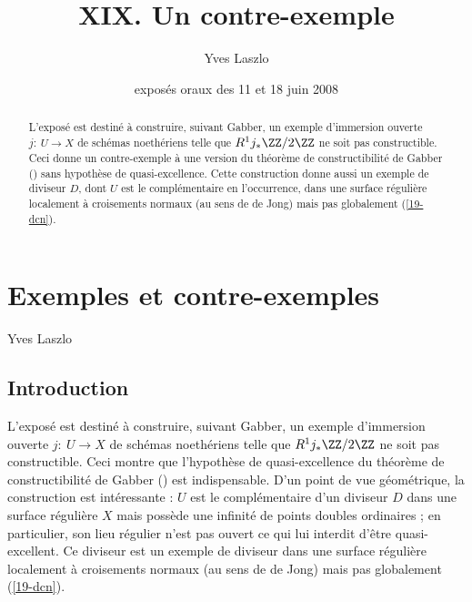 \documentclass[10pt]{../fichiers-configuration-latex/smfart}
\begin{document}
\author{Yves Laszlo}

\title{XIX. Un contre-exemple}
\date{exposés oraux des  11 et 18 juin 2008}

\setcounter{tocdepth}{3}

\begin{abstract}L'exposé est destiné à construire, suivant Gabber, un exemple d'immersion ouverte
$j:\ U\rightarrow X$ de schémas noethériens telle que $R^1j_*\ZZ/2\ZZ$ ne soit pas constructible.
Ceci donne un contre-exemple à une version du théorème de constructibilité de Gabber
() sans hypothèse de quasi-excellence. Cette construction donne
aussi un exemple de diviseur $D$, dont $U$ est le complémentaire en l'occurrence, dans une surface
régulière localement à croisements normaux (au sens de de Jong) mais pas globalement (\ref{19-dcn}).
\end{abstract}

\maketitle

\tableofcontents

\else
{}
\chapter{Exemples et contre-exemples}
\begin{center}
Yves Laszlo
\end{center}
\fi

\section{Introduction}

L'exposé est destiné à construire, suivant Gabber, un exemple d'immersion ouverte $j:\ U\rightarrow
X$ de schémas noethériens telle que $R^1j_*\ZZ/2\ZZ$ ne soit pas constructible. Ceci montre que
l'hypothèse de quasi-excellence du théorème de constructibilité de Gabber
() est indispensable. D'un point de vue géométrique, la
construction est intéressante : $U$ est le complémentaire d'un diviseur $D$ dans une surface
régulière $X$  mais possède une infinité de points doubles ordinaires ; en particulier, son lieu
régulier n'est pas ouvert ce qui lui interdit d'être quasi-excellent. Ce diviseur est un exemple de
diviseur dans une surface régulière localement à croisements normaux (au sens de de Jong) mais pas
globalement (\ref{19-dcn}).
\end{document}
